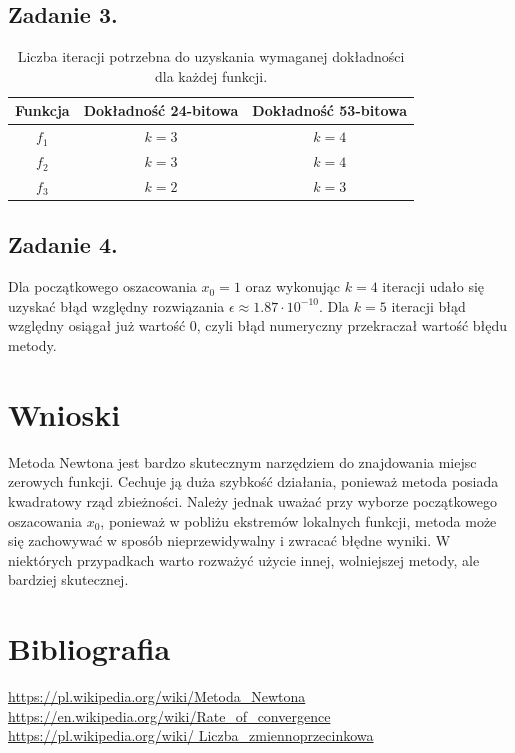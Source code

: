 \documentclass[11pt, leqno]{scrartcl}
\begin{document}
    \subsection{Zadanie 3.}
    \begin{table}[H]
        \centering
        \renewcommand{\arraystretch}{1.5}
        \begin{tabular}{|c|c|c|}
            \hline
            Funkcja & Dokładność 24-bitowa & Dokładność
                53-bitowa \\
            \hline
            $f_1$ & $k=3$ & $k=4$ \\
            \hline
            $f_2$ & $k=3$ & $k=4$ \\
            \hline
            $f_3$ & $k=2$ & $k=3$ \\
            \hline
        \end{tabular}
        \caption{Liczba iteracji potrzebna do uzyskania
            wymaganej dokładności dla każdej funkcji.}
    \end{table}

    \subsection{Zadanie 4.}
    Dla początkowego oszacowania $x_0=1$ oraz wykonując
    $k=4$ iteracji udało się uzyskać błąd względny rozwiązania
    $\epsilon \approx 1.87 \cdot 10^{-10}$. Dla $k=5$
    iteracji błąd względny osiągał już wartość 0, czyli
    błąd numeryczny przekraczał wartość błędu metody.

    \section{Wnioski}
    Metoda Newtona jest bardzo skutecznym narzędziem do
    znajdowania miejsc zerowych funkcji. Cechuje ją duża
    szybkość działania, ponieważ metoda posiada kwadratowy
    rząd zbieżności. Należy jednak uważać przy wyborze
    początkowego oszacowania $x_0$, ponieważ w pobliżu
    ekstremów lokalnych funkcji, metoda może się zachowywać
    w sposób nieprzewidywalny i zwracać błędne wyniki.
    W niektórych przypadkach warto rozważyć użycie innej,
    wolniejszej metody, ale bardziej skutecznej.

    \section{Bibliografia}
    \url{https://pl.wikipedia.org/wiki/Metoda_Newtona} \\
    \url{https://en.wikipedia.org/wiki/Rate_of_convergence} \\
    \url{https://pl.wikipedia.org/wiki/
        Liczba_zmiennoprzecinkowa}
\end{document}
